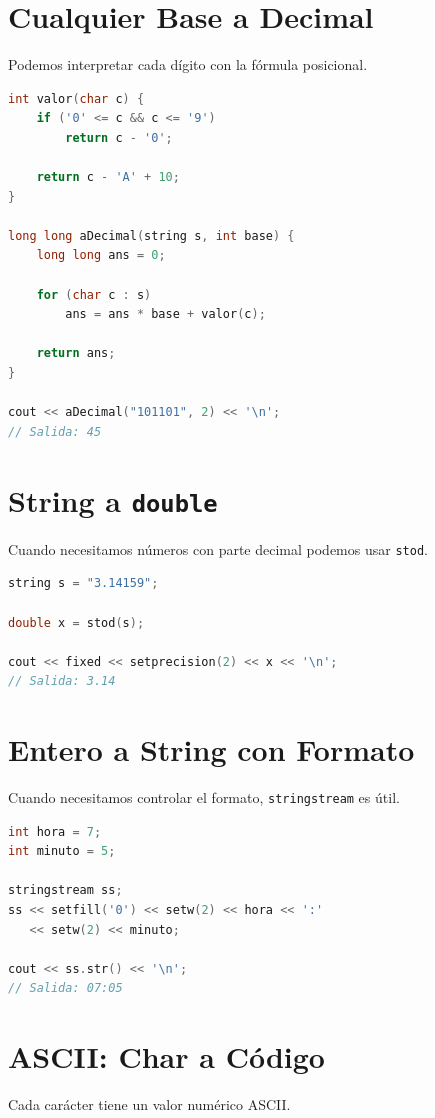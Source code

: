 \documentclass[10pt,twocolumn,letterpaper]{report}
\begin{document}
\section{Cualquier Base a Decimal}
Podemos interpretar cada dígito con la fórmula posicional.

\begin{lstlisting}[language=C++]
int valor(char c) {
    if ('0' <= c && c <= '9')
        return c - '0';

    return c - 'A' + 10;
}

long long aDecimal(string s, int base) {
    long long ans = 0;

    for (char c : s)
        ans = ans * base + valor(c);

    return ans;
}

cout << aDecimal("101101", 2) << '\n';
// Salida: 45
\end{lstlisting}

\section{String a \texttt{double}}
Cuando necesitamos números con parte decimal podemos usar \texttt{stod}.

\begin{lstlisting}[language=C++]
string s = "3.14159";

double x = stod(s);

cout << fixed << setprecision(2) << x << '\n';
// Salida: 3.14
\end{lstlisting}

\section{Entero a String con Formato}
Cuando necesitamos controlar el formato, \texttt{stringstream} es útil.

\begin{lstlisting}[language=C++]
int hora = 7;
int minuto = 5;

stringstream ss;
ss << setfill('0') << setw(2) << hora << ':'
   << setw(2) << minuto;

cout << ss.str() << '\n';
// Salida: 07:05
\end{lstlisting}

\section{ASCII: Char a Código}
Cada carácter tiene un valor numérico ASCII.
\end{document}
